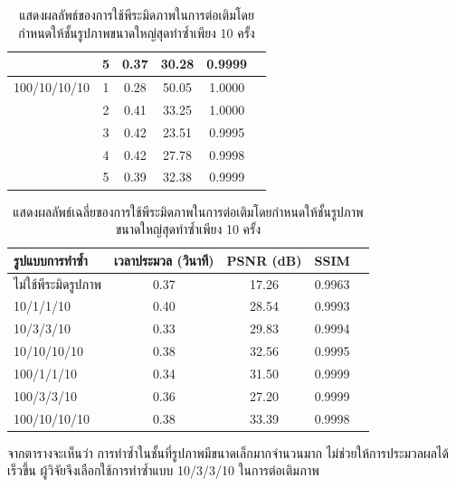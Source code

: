 \documentclass[hidelinks, a4paper,12pt]{article}
\numberwithin{equation}{section}							%
\numberwithin{equation}{section}
\begin{document}
{\begin{table}[H]
\begin{tabular}[ht]{|l|c|c|c|c|c|}
			& 5 & 0.37 & 30.28 & 0.9999 \\
			\hline
			100/10/10/10  & 1 & 0.28 & 50.05 &  1.0000\\
			& 2 & 0.41 & 33.25 &  1.0000\\
			& 3 & 0.42 & 23.51 & 0.9995 \\
			& 4 & 0.42 & 27.78 & 0.9998 \\
			& 5 & 0.39 & 32.38 & 0.9999 \\
			\hline
		\end{tabular}
		\caption{แสดงผลลัพธ์ของการใช้พีระมิดภาพในการต่อเติมโดยกำหนดให้ชั้นรูปภาพขนาดใหญ่สุดทำซ้ำเพียง 10 ครั้ง}
	\end{table}	
	\begin{table}[H]
		\centering
		\begin{tabular}[ht]{|l|c|c|c|c|}
			\hline
			รูปแบบการทำซ้ำ  & เวลาประมวล  (วินาที) & PSNR (dB) & SSIM \\
			\hline
			ไม่ใช้พีระมิดรูปภาพ & 0.37 & 17.26 & 0.9963  \\
			10/1/1/10 & 0.40 & 28.54 & 0.9993 \\
			10/3/3/10 & 0.33 & 29.83  & 0.9994 \\
			10/10/10/10 & 0.38 & 32.56 & 0.9995 \\
			100/1/1/10 & 0.34 & 31.50 & 0.9999 \\
			100/3/3/10 & 0.36 & 27.20 & 0.9999 \\
			100/10/10/10 & 0.38 & 33.39 & 0.9998 \\
			\hline
		\end{tabular}
		\caption{แสดงผลลัพธ์เฉลี่ยของการใช้พีระมิดภาพในการต่อเติมโดยกำหนดให้ชั้นรูปภาพขนาดใหญ่สุดทำซ้ำเพียง 10 ครั้ง}
	\end{table}	

	\hspace{1cm}จากตารางจะเห็นว่า การทำซ้ำในชั้นที่รูปภาพมีขนาดเล็กมากจำนวนมาก ไม่ช่วยให้การประมวลผลได้เร็วขึ้น ผู้วิจัยจึงเลือกใช้การทำซ้ำแบบ 10/3/3/10 ในการต่อเติมภาพ
	
}
\end{document}
